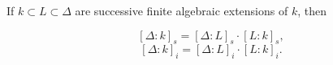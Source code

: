 If $k \subset L \subset \Delta$ are successive finite algebraic extensions of $k$, then

$$[\Delta:k]_s = [\Delta:L]_s \cdot [L:k]_s,$$
$$[\Delta:k]_i = [\Delta:L]_i \cdot [L:k]_i.$$
